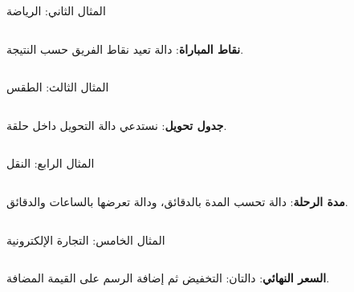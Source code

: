 \documentclass[aspectratio=169, 11pt, t, xcolor={table}]{beamer}
\begin{document}
\begin{frame}[t]{المثال الثاني: الرياضة}
    \begin{columns}[T]
        {\small \textbf{نقاط المباراة}: دالة تعيد نقاط الفريق حسب النتيجة.\par}
        \vspace{0.3cm}
    \end{columns}
\end{frame}

\begin{frame}[t]{المثال الثالث: الطقس}
    \begin{columns}[T]
        {\small \textbf{جدول تحويل}: نستدعي دالة التحويل داخل حلقة.\par}
        \vspace{0.3cm}
    \end{columns}
\end{frame}

\begin{frame}[t]{المثال الرابع: النقل}
    \begin{columns}[T]
        {\small \textbf{مدة الرحلة}: دالة تحسب المدة بالدقائق، ودالة تعرضها بالساعات والدقائق.\par}
        \vspace{0.3cm}
    \end{columns}
\end{frame}

\begin{frame}[t]{المثال الخامس: التجارة الإلكترونية}
    \begin{columns}[T]
        {\small \textbf{السعر النهائي}: دالتان: التخفيض ثم إضافة الرسم على القيمة المضافة.\par}
        \vspace{0.3cm}
    \end{columns}
\end{frame}
\end{document}
